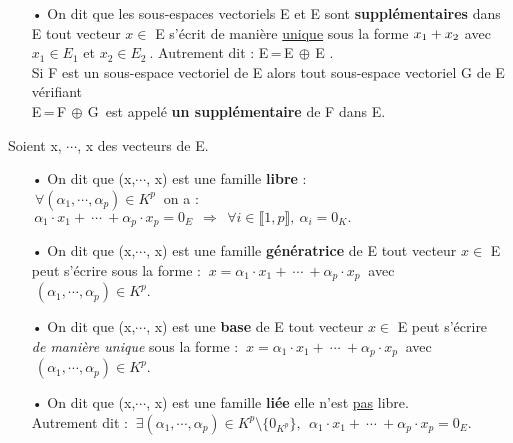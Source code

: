 \begin{itemize}[leftmargin=0.5cm]
    \item[•] On dit que les sous-espaces vectoriels E et E sont \textbf{supplémentaires} dans E \ssi tout vecteur \(x\in\) E s'écrit de manière \underline{unique} sous la forme \(x\textsubscript{1} + x\textsubscript{2}\)  avec \( x_1 \in  E_1 \) et \( x_2 \in  E_2\ \). Autrement dit : E\,=\,E\(\,\oplus\,\)E\vspace{0.1cm} .\vspace{0.1cm}\\
    Si F est un sous-espace vectoriel de E alors tout sous-espace vectoriel G de E vérifiant\\
    E\,=\,F\(\,\oplus\,\)G\ est appelé \textbf{un supplémentaire} de F dans E.
\end{itemize}

\vspace{1cm}

\noindent Soient x, $\cdots$, x des vecteurs de E.\vspace{-0.2cm}
\begin{itemize}[leftmargin=1cm]
    \item[•] On dit que (x,\(\cdots\), x) est une famille \textbf{libre} \ssi :\vspace{0.1cm} \\ \(\ \forall(\alpha_1, \cdots, \alpha_p)\in K^p\ \) on a : \(\, \alpha_1 \cdot x_1 + \ \cdots \ + \alpha_p \cdot x_p=0_E\ \ \Rightarrow \ \ \forall i\in \llbracket 1,p \rrbracket ,\ \alpha_i = 0_K. \) \vspace{0.3cm}

     \item[•] On dit que (x,\(\cdots\), x) est une famille \textbf{génératrice} de E \ssi tout vecteur \(x\in\) E\vspace{0.1cm}\\
     peut s'écrire sous la forme : \(\ x=\alpha_1 \cdot x_1 + \ \cdots \ + \alpha_p \cdot x_p\ \) avec \(\ (\alpha_1, \cdots, \alpha_p)\in K^p\). \vspace{0.3cm}

     \item[•] On dit que (x,\(\cdots\), x) est une \textbf{base} de E \ssi tout vecteur \(x\in\) E peut s'écrire\vspace{0.1cm}\\
     \emph{de manière unique} sous la forme : \(\ x=\alpha_1 \cdot x_1 + \ \cdots \ + \alpha_p \cdot x_p\ \) avec \(\ (\alpha_1, \cdots, \alpha_p)\in K^p\).\vspace{0.3cm}

      \item[•] On dit que (x,\(\cdots\), x) est une famille \textbf{liée} \ssi elle n'est \underline{pas} libre. \vspace{0.1cm}\\
      Autrement dit : \(\ \exists (\alpha_1, \cdots, \alpha_p)\in K^p\setminus\{0_{K^p}\},\ \ \alpha_1 \cdot x_1 + \ \cdots \ + \alpha_p \cdot x_p=0_E. \)
\end{itemize}

